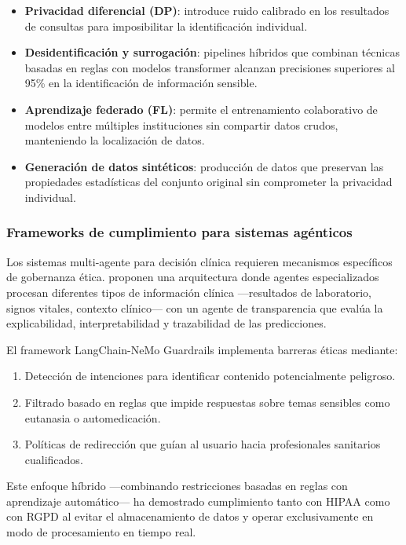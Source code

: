 \begin{itemize}[nosep, leftmargin=*]
    \item \textbf{Privacidad diferencial (DP)}: introduce ruido calibrado en los resultados de consultas para imposibilitar la identificación individual.
    \item \textbf{Desidentificación y surrogación}: pipelines híbridos que combinan técnicas basadas en reglas con modelos transformer alcanzan precisiones superiores al 95\% en la identificación de información sensible.
    \item \textbf{Aprendizaje federado (FL)}: permite el entrenamiento colaborativo de modelos entre múltiples instituciones sin compartir datos crudos, manteniendo la localización de datos.
    \item \textbf{Generación de datos sintéticos}: producción de datos que preservan las propiedades estadísticas del conjunto original sin comprometer la privacidad individual.
\end{itemize}

\subsubsection{Frameworks de cumplimiento para sistemas agénticos}

Los sistemas multi-agente para decisión clínica requieren mecanismos específicos de gobernanza ética. \textcite{chen2025enhancing} proponen una arquitectura donde agentes especializados procesan diferentes tipos de información clínica ---resultados de laboratorio, signos vitales, contexto clínico--- con un agente de transparencia que evalúa la explicabilidad, interpretabilidad y trazabilidad de las predicciones.

El framework LangChain-NeMo Guardrails \parencite{arun2025ethical} implementa barreras éticas mediante:
\begin{enumerate}[nosep, leftmargin=*]
    \item Detección de intenciones para identificar contenido potencialmente peligroso.
    \item Filtrado basado en reglas que impide respuestas sobre temas sensibles como eutanasia o automedicación.
    \item Políticas de redirección que guían al usuario hacia profesionales sanitarios cualificados.
\end{enumerate}

Este enfoque híbrido ---combinando restricciones basadas en reglas con aprendizaje automático--- ha demostrado cumplimiento tanto con \ac{HIPAA} como con \ac{RGPD} al evitar el almacenamiento de datos y operar exclusivamente en modo de procesamiento en tiempo real.

